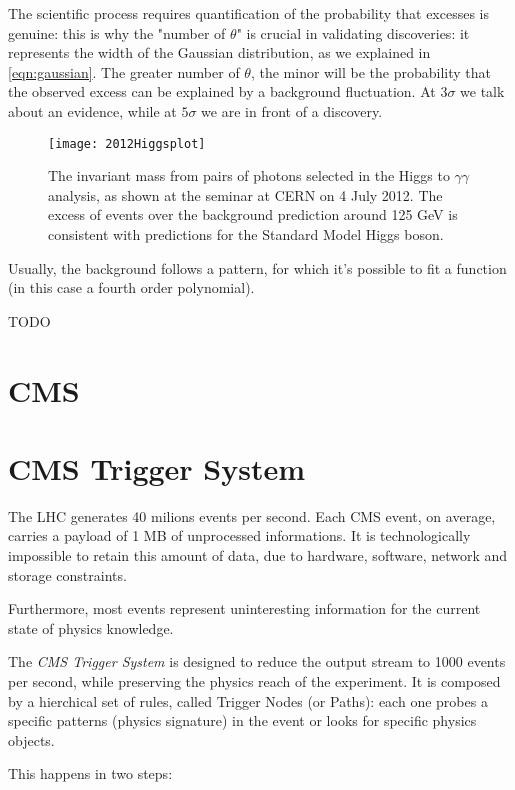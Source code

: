 The scientific process requires quantification of the probability that excesses is genuine: this is why the "number of $\theta$" is crucial in validating discoveries: it represents the width of the Gaussian distribution, as we explained in \ref{eqn:gaussian}. The greater number of $\theta$, the minor will be the probability that the observed excess can be explained by a background fluctuation.
At $3\sigma$ we talk about an evidence, while at $5\sigma$ we are in front of a discovery.


\begin{figure}
	\centerline{
		\texttt{[image: 2012Higgsplot]}}
	\caption{The invariant mass from pairs of photons selected in the Higgs to $\gamma\gamma$ analysis, as shown at the seminar at CERN on 4 July 2012. The excess of events over the background prediction around 125 GeV is consistent with predictions for the Standard Model Higgs boson.\cite{Collaboration:2627611}}
\end{figure}

Usually, the background follows a pattern, for which it's possible to fit a function (in this case a fourth order polynomial).

TODO


\section{CMS}

\section{CMS Trigger System}


The LHC generates 40 milions events per second. Each CMS event, on average, carries a payload of 1 MB of unprocessed informations. It is technologically impossible to retain this amount of data, due to hardware, software, network and storage constraints.

Furthermore, most events represent uninteresting information for the current state of physics knowledge.

The \textit{CMS Trigger System} is designed to reduce the output stream to 1000 events per second, while preserving the physics reach of the experiment.
It is composed by a hierchical set of rules, called Trigger Nodes (or Paths): each one probes a specific patterns (physics signature) in the event or looks for specific physics objects.

This happens in two steps:

